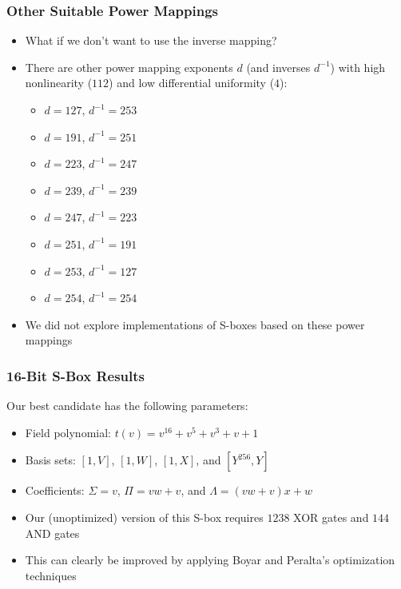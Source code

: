 \documentclass[10pt]{beamer}
\begin{document}
\begin{frame}
	\frametitle{Other Suitable Power Mappings}
	\begin{itemize}
		\item What if we don't want to use the inverse mapping?
		\item There are other power mapping exponents $d$ (and inverses $d^{-1}$) with high nonlinearity ($112$) and low differential uniformity ($4$):
		\begin{itemize}
			\itemsep0em
			\item $d = 127$, $d^{-1} = 253$
			\item $d = 191$, $d^{-1} = 251$
			\item $d = 223$, $d^{-1} = 247$
			\item $d = 239$, $d^{-1} = 239$
			\item $d = 247$, $d^{-1} = 223$
			\item $d = 251$, $d^{-1} = 191$
			\item $d = 253$, $d^{-1} = 127$
			\item $d = 254$, $d^{-1} = 254$
		\end{itemize}
		\item We did not explore implementations of S-boxes based on these power mappings
	\end{itemize}
\end{frame}

\begin{frame}
	\frametitle{16-Bit S-Box Results}
	Our best candidate has the following parameters:
	\begin{itemize}
		\item Field polynomial: $t(v) = v^{16} + v^5 + v^3 + v + 1$
		\item Basis sets: $[1, V]$, $[1, W]$, $[1, X]$, and $[Y^{256}, Y]$
		\item Coefficients: $\Sigma = v$, $\Pi = vw + v$, and $\Lambda = (vw + v)x + w$
	\end{itemize}

	\begin{itemize}
		\item Our (unoptimized) version of this S-box requires $1238$ XOR gates and $144$ AND gates 
		\item This can clearly be improved by applying Boyar and Peralta's optimization techniques
	\end{itemize}
\end{frame}
\end{document}
